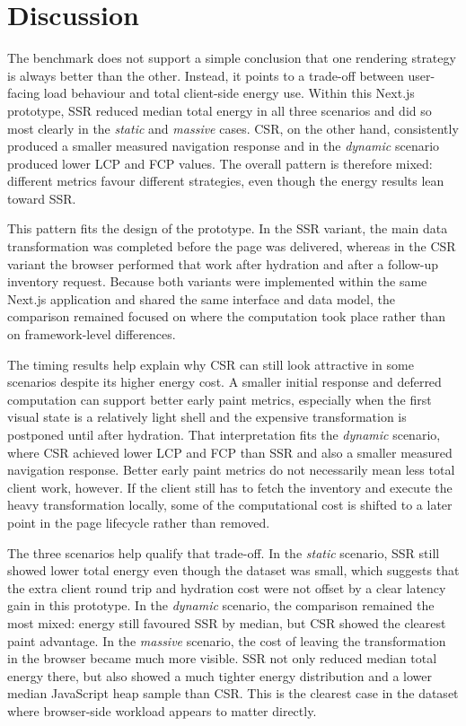 \section{Discussion}

The benchmark does not support a simple conclusion that one rendering strategy is always better than the other. Instead, it points to a trade-off between user-facing load behaviour and total client-side energy use. Within this Next.js prototype, SSR reduced median total energy in all three scenarios and did so most clearly in the \textit{static} and \textit{massive} cases. CSR, on the other hand, consistently produced a smaller measured navigation response and in the \textit{dynamic} scenario produced lower LCP and FCP values. The overall pattern is therefore mixed: different metrics favour different strategies, even though the energy results lean toward SSR.

This pattern fits the design of the prototype. In the SSR variant, the main data transformation was completed before the page was delivered, whereas in the CSR variant the browser performed that work after hydration and after a follow-up inventory request. Because both variants were implemented within the same Next.js application and shared the same interface and data model, the comparison remained focused on where the computation took place rather than on framework-level differences.

The timing results help explain why CSR can still look attractive in some scenarios despite its higher energy cost. A smaller initial response and deferred computation can support better early paint metrics, especially when the first visual state is a relatively light shell and the expensive transformation is postponed until after hydration. That interpretation fits the \textit{dynamic} scenario, where CSR achieved lower LCP and FCP than SSR and also a smaller measured navigation response. Better early paint metrics do not necessarily mean less total client work, however. If the client still has to fetch the inventory and execute the heavy transformation locally, some of the computational cost is shifted to a later point in the page lifecycle rather than removed.

The three scenarios help qualify that trade-off. In the \textit{static} scenario, SSR still showed lower total energy even though the dataset was small, which suggests that the extra client round trip and hydration cost were not offset by a clear latency gain in this prototype. In the \textit{dynamic} scenario, the comparison remained the most mixed: energy still favoured SSR by median, but CSR showed the clearest paint advantage. In the \textit{massive} scenario, the cost of leaving the transformation in the browser became much more visible. SSR not only reduced median total energy there, but also showed a much tighter energy distribution and a lower median JavaScript heap sample than CSR. This is the clearest case in the dataset where browser-side workload appears to matter directly.

